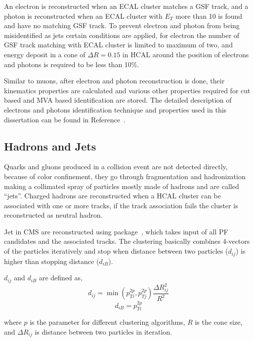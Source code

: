 An electron is reconstructed when an \gls{ECAL} cluster matches a \gls{GSF} track,
and a photon is reconstructed when an \gls{ECAL} cluster with \( E_T \)
more than 10\GeV{} is found and have no matching \gls{GSF} track. To prevent
electron and photon from being misidentified as jets certain conditions are applied,
for electron the number of \gls{GSF} track matching with \gls{ECAL} cluster is limited to
maximum of two, and energy deposit in a cone of \( \Delta R = 0.15 \) in \gls{HCAL}
around the position of electrons and photons is required to be less than 10\%.

Similar to muons, after electron and photon reconstruction is done, their kinematics properties
are calculated and various other properties required for cut based
and \gls{MVA} based identification are stored. The detailed description of electrons
and photons identification technique and properties used in this dissertation
can be found in Reference~\cite{cms-egamma-id}.

\subsection{
  Hadrons and Jets
}\label{ch_reco:jets}

Quarks and gluons produced in a collision event are not detected directly,
because of color confinement, they go through fragmentation and
hadronization making a collimated spray of particles mostly made of hadrons
and are called ``jets''. Charged hadrons are reconstructed when a \gls{HCAL} cluster can be associated with
one or more tracks, if the track association fails the cluster is reconstructed as
neutral hadron.

Jet in \gls{CMS} are reconstructed using \FASTJET{} package~\cite{fastjet-manual},
which takes input of all \gls{PF} candidates and the associated tracks. The clustering
basically combines 4-vectors of the particles iteratively and stop when distance between
two particles (\( d_{ij} \)) is higher than stopping distance (\( d_{iB} \)).

\( d_{ij} \) and \( d_{iB} \) are defined as,
%
\begin{equation}
  d_{ij} = \min (p_{Ti}^{2p}, p_{Tj}^{2p}) \frac{\Delta R_{ij}^{2}}{R^{2}}
\end{equation}
%
\begin{equation}
  d_{iB} = p_{Ti}^{2p}
\end{equation}

where \( p \) is the parameter for different clustering algorithms, \( R \) is the
cone size, and
\( \Delta R_{ij} \) is distance between two particles in iteration.

